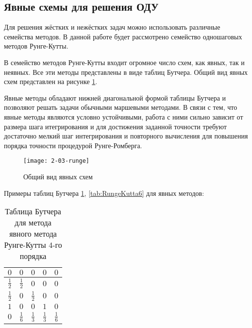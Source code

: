 \subsection{Явные схемы для решения ОДУ}

Для решения жёстких и нежёстких задач можно использовать различные семейства методов. В данной работе будет рассмотрено семейство
одношаговых методов Рунге-Кутты.

В семейство методов Рунге-Кутты входит огромное число схем, как явных, так и неявных. Все эти методы представлены в виде таблиц
Бутчера. Общий вид явных схем представлен на рисунке \ref{fig:Runge}.

Явные методы обладают нижней диагональной формой таблицы Бутчера и позволяют решать задачи обычными маршевыми методами. В связи с тем,
что явные методы являются условно устойчивыми, работа с ними сильно зависит от размера шага итегрирования и для достижения заданной
точности требуют достаточно мелкий шаг интегрирования и повторного вычисления для повышения порядка точности процедурой Рунге-Ромберга.



\begin{figure}
    \texttt{[image: 2-03-runge]}
    \caption{Общий вид явных схем}
    \label{fig:Runge}
\end{figure}

Примеры таблиц Бутчера \ref{tab:RungeKutta4}, \ref{tab:RungeKutta6} для явных методов:

\begin{table}    
    \caption{Таблица Бутчера для метода явного метода Рунге-Кутты 4-го порядка}
    \begin{tabular}{|c|c|c|c|c|}
    \hline
    $0$ & $0$ & $0$ & $0$ & $0$\\
    \hline
    $\frac{1}{2}$ & $\frac{1}{2}$ & $0$ & $0$ & $0$\\
    \hline
    $\frac{1}{2}$ & $0$ & $\frac{1}{2}$ & $0$ & $0$\\
    \hline
    $1$ & $0$ & $0$ & $1$ & $0$\\
    \hline
    $0$ & \cellcolor{lightgray} $\frac{1}{6}$ & \cellcolor{lightgray} $\frac{1}{3}$ & \cellcolor{lightgray} $\frac{1}{3}$ & \cellcolor{lightgray} $\frac{1}{6}$\\
    \hline
    \end{tabular}
    \label{tab:RungeKutta4}
\end{table}

